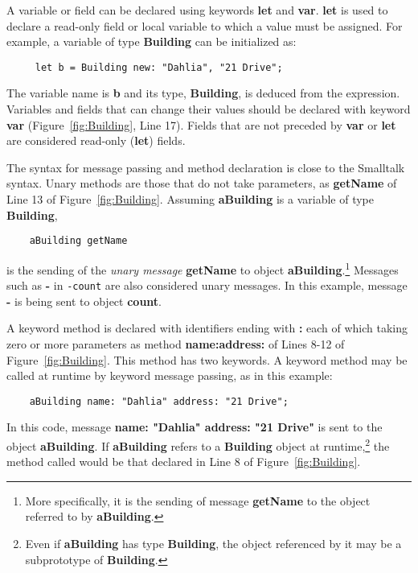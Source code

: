 \documentclass[preprint,review]{elsarticle}
\newcommand{\srcstyle}[1]{\ttfamily\textbf{#1}\rmfamily}
\begin{document}
A variable or field can  be declared using keywords \srcstyle{let} and
\srcstyle{var}. \srcstyle{let} is used to declare a read-only field or local variable
to which a value must be assigned.  For example, a variable
of type \srcstyle{Building} can be initialized as:
\begin{verbatim}
     let b = Building new: "Dahlia", "21 Drive";
\end{verbatim}
The variable  name is \srcstyle{b} and  its type, \srcstyle{Building},
is deduced from the expression.   Variables and fields that can change
their  values  should  be  declared  with  keyword  \srcstyle{var}
(Figure~\ref{fig:Building}, Line 17).  Fields that are not preceded by
\srcstyle{var}    or   \srcstyle{let}    are   considered    read-only
(\srcstyle{let}) fields.


The syntax for message passing and method declaration is close to the Smalltalk syntax. Unary methods are those that do not take parameters, as \srcstyle{getName} of Line 13 of Figure~\ref{fig:Building}. Assuming \srcstyle{aBuilding}  is a variable
of type \srcstyle{Building},
\begin{verbatim}
    aBuilding getName
\end{verbatim}
is  the  sending of  the  \emph{unary  message} \srcstyle{getName}  to
object \srcstyle{aBuilding}.\footnote{More specifically, it  is the sending of
  message   \srcstyle{getName}   to   the  object   referred   to   by
  \srcstyle{aBuilding}.}     Messages    such     as    \srcstyle{-}    in
\verb|-count| are also considered unary messages. In this example,
message \srcstyle{-} is being sent to object \srcstyle{count}.

A keyword method is declared with identifiers ending with \srcstyle{:} each of which taking zero or more parameters as method \srcstyle{name:address:} of Lines 8-12 of Figure~\ref{fig:Building}. This method has two keywords. A keyword method may be called at runtime by keyword message passing, as in this example:
\begin{verbatim}
    aBuilding name: "Dahlia" address: "21 Drive";
\end{verbatim}
In this code, message \srcstyle{name: "Dahlia" address: "21 Drive"} is sent to the object \srcstyle{aBuilding}. If   \srcstyle{aBuilding}   refers   to  a   \srcstyle{Building}   object   at
runtime,\footnote{Even if  \srcstyle{aBuilding} has  type \srcstyle{Building},
  the   object   referenced    by   it   may   be    a   subprototype   of
  \srcstyle{Building}.} the  method called  would be that  declared in
Line 8 of Figure~\ref{fig:Building}.
\end{document}
